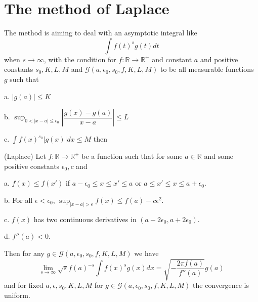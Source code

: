 \documentclass[lang=en, color=blue, ]{elegantbook}
\newcommand{\R}{\mathbb{R}}
\begin{document}
\section{The method of Laplace}

The method is aiming to deal with an asymptotic integral like
\[\int f(t)^{s}g(t)dt\]
when $s\to \infty$, with the condition for $f:\R\to\R^+$ and constant $a$ and positive constants $s_0,K,L,M$ and $\mathcal{G}(a,\epsilon_0,s_0,f,K,L,M)$ to be all measurable functions $g$ such that\par
a. $|g(a)| \leq K$\par
b. $\sup_{0<|x-a|\leq\epsilon_0} \left|\dfrac{g(x)-g(a)}{x-a}\right| \leq L$\par
c. $\int f(x)^{s_0}|g(x)|dx \leq M$ then

\begin{theorem}
    (Laplace) Let $f:\R \to \R^+$ be a function such that for some $a\in \R$ and some positive constants $\epsilon_0,c$ and\par
    a. $f(x)\leq f(x')$ if $a-\epsilon_0 \leq x \leq x' \leq a$ or $a\leq x'\leq x\leq a+\epsilon_0$.\par
    b. For all $\epsilon < \epsilon_0$, $\sup_{|x-a|>\epsilon}f(x) \leq f(a) - c\epsilon^2$.\par
    c. $f(x)$ has two continuous derivatives in $(a-2\epsilon_0,a+2\epsilon_0)$.\par
    d. $f''(a) < 0$.\par
    Then for any $g\in \mathcal{G}(a,\epsilon_0,s_0,f,K,L,M) $ we have
    \[
    \lim_{s\to \infty}\sqrt{s}f(a)^{-s}\int f(x)^sg(x)dx = \sqrt{-\dfrac{2\pi f(a)}{f''(a)}}g(a)
    \]
    and for fixed $a,\epsilon,s_0,K,L,M$ for $g\in \mathcal{G}(a,\epsilon_0,s_0,f,K,L,M)$ the convergence is uniform.
\end{theorem}
\end{document}
